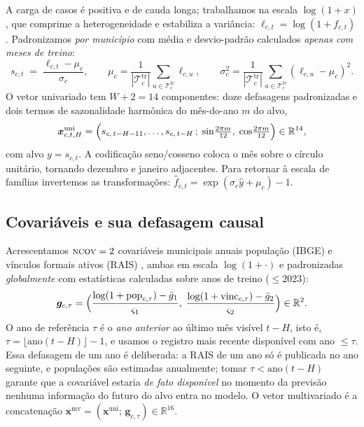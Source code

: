 \documentclass[12pt,a4paper,oneside]{article}
\begin{document}
A carga de casos é positiva e de cauda longa; trabalhamos na escala
$\log(1+x)$, que comprime a heterogeneidade e estabiliza a variância:
$\ell_{c,t}=\log(1+f_{c,t})$. Padronizamos \emph{por município} com média e
desvio-padrão calculados \emph{apenas com meses de treino}:
\begin{equation}
s_{c,t} \;=\; \frac{\ell_{c,t}-\mu_c}{\sigma_c},
\qquad
\mu_c=\frac{1}{|\mathcal{T}_c^{\text{tr}}|}\!\!\sum_{u\in\mathcal{T}_c^{\text{tr}}}\!\!\ell_{c,u},
\qquad
\sigma_c^2=\frac{1}{|\mathcal{T}_c^{\text{tr}}|}\!\!\sum_{u\in\mathcal{T}_c^{\text{tr}}}\!\!(\ell_{c,u}-\mu_c)^2 .
\label{eq:padroniza}
\end{equation}
O vetor univariado tem $W+2=14$ componentes: doze defasagens padronizadas
e dois termos de sazonalidade harmônica do mês-do-ano $m$ do alvo,
\begin{equation}
\bm{x}^{\text{uni}}_{c,t,H}
=\Bigl(s_{c,\,t-H-11},\dots,s_{c,\,t-H}\,;\;
\sin\!\tfrac{2\pi m}{12},\;\cos\!\tfrac{2\pi m}{12}\Bigr)\in\mathbb{R}^{14},
\label{eq:atributos}
\end{equation}
com alvo $y=s_{c,t}$. A codificação seno/cosseno coloca o mês sobre o
círculo unitário, tornando dezembro e janeiro adjacentes. Para retornar à
escala de famílias invertemos as transformações:
$\widehat{f}_{c,t}=\exp(\sigma_c\widehat{y}+\mu_c)-1$.

\subsection{Covariáveis e sua defasagem causal}

Acrescentamos $\textsc{ncov}=2$ covariáveis municipais anuais
\textemdash{} população (IBGE) e vínculos formais ativos (RAIS)
\textemdash{}, ambas em escala $\log(1+\cdot)$ e padronizadas
\emph{globalmente} com estatísticas calculadas sobre anos de treino
(${}\le 2023$):
\begin{equation}
\bm{g}_{c,\tau}
=\Bigl(\frac{\log(1+\text{pop}_{c,\tau})-\bar{g}_1}{\varsigma_1},\;
       \frac{\log(1+\text{vinc}_{c,\tau})-\bar{g}_2}{\varsigma_2}\Bigr)\in\mathbb{R}^{2}.
\label{eq:cov}
\end{equation}
O ano de referência $\tau$ é o \emph{ano anterior} ao último mês visível
$t-H$, isto é, $\tau=\lfloor\text{ano}(t-H)\rfloor-1$, e usamos o registro
mais recente disponível com ano ${}\le\tau$. Essa defasagem de um ano é
deliberada: a RAIS de um ano só é publicada no ano seguinte, e populações
são estimadas anualmente; tomar $\tau<\text{ano}(t-H)$ garante que a
covariável estaria \emph{de fato disponível} no momento da previsão
\textemdash{} nenhuma informação do futuro do alvo entra no modelo. O
vetor multivariado é a concatenação
$\bm{x}^{\text{mv}}=(\bm{x}^{\text{uni}};\,\bm{g}_{c,\tau})\in\mathbb{R}^{16}$.
\end{document}
